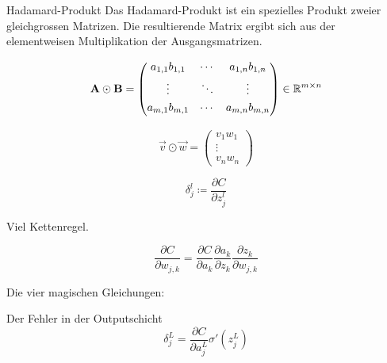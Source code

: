 \documentclass[../main]{subfiles}
\begin{document}
\par\medskip
\begin{defbox}{Hadamard-Produkt}
  Das Hadamard-Produkt ist ein spezielles Produkt zweier gleichgrossen Matrizen.
  Die resultierende Matrix ergibt sich aus der elementweisen Multiplikation der Ausgangsmatrizen.

  \begin{minipage}{0.5\textwidth}
    \begin{equation*}
      \mathbf{A} \odot \mathbf{B} =
      \begin{pmatrix}
        a_{1,1} b_{1,1} & \cdots & a_{1,n} b_{1,n} \\[0.3em]
        \vdots & \ddots & \vdots \\[0.3em]
        a_{m,1} b_{m,1} & \cdots & a_{m,n} b_{m,n} \\[0.3em]
      \end{pmatrix}
      \in \mathbb{R}^{m \times n}
    \end{equation*}
  \end{minipage}
  \begin{minipage}{0.5\textwidth}
    \begin{equation*}
      \vec{v} \odot \vec{w} =
      \begin{pmatrix}
        v_1 w_1 \\
        \vdots \\
        v_n w_n
      \end{pmatrix}
    \end{equation*}

  \end{minipage}
\end{defbox}
\par\medskip

\begin{equation}
  \delta_j^l \coloneqq \frac{\partial C}{\partial z_j^l}
\end{equation}

Viel Kettenregel.

\begin{equation}
  \frac{\partial C}{\partial w_{j,k}} = \frac{\partial C}{\partial a_k} \frac{\partial a_k}{\partial z_k} \frac{\partial z_k}{\partial w_{j,k}}
\end{equation}

Die vier magischen Gleichungen:

Der Fehler in der Outputschicht
\begin{equation}\tag{BP1}
  \delta_j^L = \frac{\partial C}{\partial a_j^L} \sigma'(z_j^L)
\end{equation}
\end{document}
